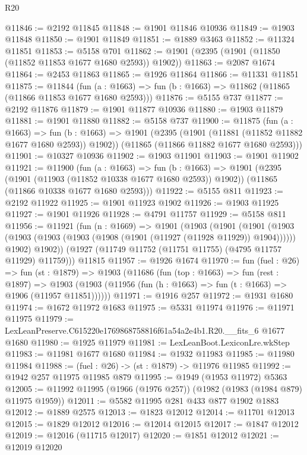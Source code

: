 \begin{lexlean}{R20}
\begin{coremodule}
@11846 := @2192 @11845
@11848 := @1901 @11846 @10936
@11849 := @1903 @11848
@11850 := @1901 @11849
@11851 := @1889 @3463
@11852 := @11324 @11851
@11853 := @5158 @701
@11862 := @1901 (@2395 (@1901 (@11850 (@11852 @11853 @1677 @1680 @2593)) @1902))
@11863 := @2087 @1674
@11864 := @2453 @11863
@11865 := @1926 @11864
@11866 := @11331 @11851
@11875 := @11844
    (fun (a : @1663) => fun (b : @1663) => @11862 (@11865 (@11866 @11853 @1677 @1680 @2593)))
@11876 := @5155 @737
@11877 := @2192 @11876
@11879 := @1901 @11877 @10936
@11880 := @1903 @11879
@11881 := @1901 @11880
@11882 := @5158 @737
@11900 := @11875
    (fun (a : @1663) =>
    fun (b : @1663) =>
    @1901
      (@2395 (@1901 (@11881 (@11852 @11882 @1677 @1680 @2593)) @1902))
      (@11865 (@11866 @11882 @1677 @1680 @2593)))
@11901 := @10327 @10936
@11902 := @1903 @11901
@11903 := @1901 @11902
@11921 := @11900
    (fun (a : @1663) =>
    fun (b : @1663) =>
    @1901
      (@2395 (@1901 (@11903 (@11852 @10338 @1677 @1680 @2593)) @1902))
      (@11865 (@11866 @10338 @1677 @1680 @2593)))
@11922 := @5155 @811
@11923 := @2192 @11922
@11925 := @1901 @11923 @1902
@11926 := @1903 @11925
@11927 := @1901 @11926
@11928 := @4791 @11757
@11929 := @5158 @811
@11956 := @11921
    (fun (n : @1669) =>
    @1901
      (@1903
        (@1901
          (@1901
            (@1903 (@1903 (@1903 (@1903 (@1908 (@1901 (@11927 (@11928 @11929)) @1904))))))
            @1902)
          @1902))
      (@1927 (@11749 @11752 (@11751 @11755) (@4795 @11757 @11929) @11759)))
    @11815
@11957 := @1926 @1674
@11970 := fun (fuel : @26) =>
  fun (st : @1879) =>
  @1903
    (@11686
      (fun (top : @1663) =>
      fun (rest : @1897) =>
      @1903 (@1903 (@11956 (fun (h : @1663) => fun (t : @1663) => @1906 (@11957 @11851))))))
@11971 := @1916 @257
@11972 := @1931 @1680
@11974 := @1672 @11972 @1683
@11975 := @5331 @11974
@11976 := @11971 @11975
@11979 := LexLeanPreserve.C615220e1769868758816f61a54a2e4b1.R20.__fits_6 @1677 @1680
@11980 := @1925 @11979
@11981 := LexLeanBoot.LexiconLre.wkStep
@11983 := @11981 @1677 @1680
@11984 := @1932 @11983
@11985 := @11980 @11984
@11988 := (fuel : @26) -> (st : @1879) -> @11976 @11985
@11992 := @1942 @257 @11975 @11985 @879
@11995 := @1949 (@1953 @11972) @5363
@12005 := @11992 @11995 (@1966 (@1976 @257)) (@1982 (@1983 (@1984 @879) @11975 @1959))
@12011 := @5582 @11995 @281 @433 @877 @1902 @1883
@12012 := @1889 @2575
@12013 := @1823 @12012
@12014 := @11701 @12013
@12015 := @1829 @12012
@12016 := @12014 @12015
@12017 := @1847 @12012
@12019 := @12016 (@11715 @12017)
@12020 := @1851 @12012
@12021 := @12019 @12020

\end{coremodule}
\end{lexlean}
